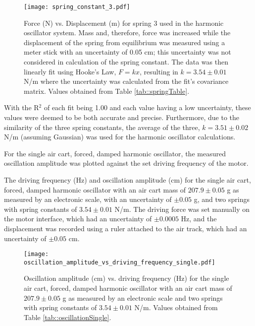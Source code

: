 \begin{figure}[H]
    \centering
	\texttt{[image: spring\_constant\_3.pdf]}
	\label{fig::spring3}
	\caption{Force (N) vs. Displacement (m) for spring 3 used in the harmonic oscillator system. Mass and, therefore, force was increased while the displacement of the spring from equilibrium was measured using a meter stick with an uncertainty of 0.05 cm; this uncertainty was not considered in calculation of the spring constant. The data was then linearly fit using Hooke's Law, $F = kx$, resulting in $k = 3.54 \pm 0.01$ N/m where the uncertainty was calculated from the fit's covariance matrix. Values obtained from Table \ref{tab::springTable}.}
\end{figure}

With the R$^2$ of each fit being 1.00 and each value having a low uncertainty, these values were deemed to be both accurate and precise. Furthermore, due to the similarity of the three spring constants, the average of the three, $k = 3.51 \pm 0.02$ N/m (assuming Gaussian) was used for the harmonic oscillator calculations.

\newpage
For the single air cart, forced, damped harmonic oscillator, the measured oscillation amplitude was plotted against the set driving frequency of the motor.

\begin{table}[H]
	\centering
	
	\caption{The driving frequency (Hz) and oscillation amplitude (cm) for the single air cart, forced, damped harmonic oscillator with an air cart mass of $207.9 \pm 0.05$ g as measured by an electronic scale, with an uncertainty of $\pm 0.05$ g, and two springs with spring constants of $3.54 \pm 0.01$ N/m. The driving force was set manually on the motor interface, which had an uncertainty of $\pm 0.0005$ Hz, and the displacement was recorded using a ruler attached to the air track, which had an uncertainty of $\pm 0.05$ cm.}
	\label{tab::oscillationSingle}
\end{table}

\begin{figure}[H]
    \centering
	\texttt{[image: oscillation\_amplitude\_vs\_driving\_frequency\_single.pdf]}
	\label{fig::resonanceSingle}
	\caption{Oscillation amplitude (cm) vs. driving frequency (Hz) for the single air cart, forced, damped harmonic oscillator with an air cart mass of $207.9 \pm 0.05$ g as measured by an electronic scale and two springs with spring constants of $3.54 \pm 0.01$ N/m. Values obtained from Table \ref{tab::oscillationSingle}.}
\end{figure}


